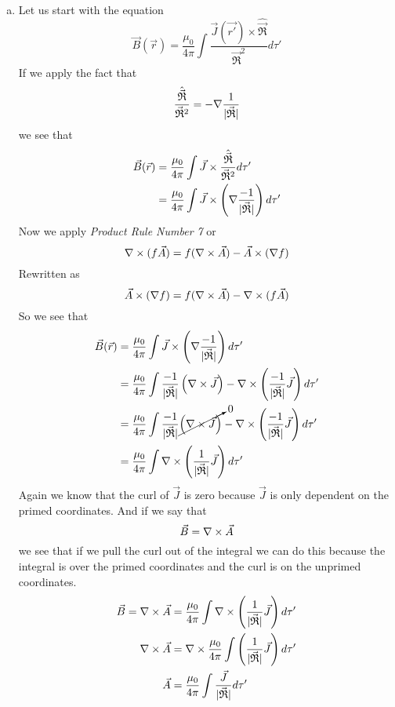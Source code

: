 \documentclass[11pt]{article}
\numberwithin{equation}{section}
\newcommand{\grad}{\bold\nabla}
\newcommand{\scrptR}{\vec{\mathfrak{R}}}
\begin{document}
\begin{enumerate}[(a)]
\item
Let us start with the equation
$$\vec{B}(\vec{r}) = \frac{\mu_0}{4\pi}\int\frac{\vec{J}(\vec{r'})\times\hat{\scrptR}}{\scrptR^2}d\tau'$$
If we apply the fact that
$$\frac{\hat{\scrptR}}{\scrptR^2} = -\grad\frac{1}{|\scrptR|}$$
we see that
\begin{align*}
\vec{B}(\vec{r}) &= \frac{\mu_0}{4\pi}\int\vec{J}\times\frac{\hat{\scrptR}}{\scrptR^2}d\tau'\\
&= \frac{\mu_0}{4\pi}\int\vec{J}\times\left(\grad\frac{-1}{|\scrptR|}\right)d\tau'
\end{align*}
Now we apply \emph{Product Rule Number 7} or
$$\grad\times(f\vec{A})=f(\grad\times\vec{A})-\vec{A}\times(\grad f)$$
Rewritten as
$$\vec{A}\times(\grad f)= f(\grad\times\vec{A})-\grad\times(f\vec{A}) $$
So we see that
\begin{align*}
\vec{B}(\vec{r}) &= \frac{\mu_0}{4\pi}\int\vec{J}\times\left(\grad\frac{-1}{|\scrptR|}\right)d\tau'\\
&= \frac{\mu_0}{4\pi}\int\frac{-1}{|\scrptR|}\left(\grad\times\vec{J}\right) - \grad\times\left(\frac{-1}{|\scrptR|}\vec{J}\right)d\tau'\\
&= \frac{\mu_0}{4\pi}\int\frac{-1}{|\scrptR|}\cancelto{0}{\left(\grad\times\vec{J}\right)} - \grad\times\left(\frac{-1}{|\scrptR|}\vec{J}\right)d\tau'\\
&= \frac{\mu_0}{4\pi}\int  \grad\times\left(\frac{1}{|\scrptR|}\vec{J}\right)d\tau'
\end{align*}
Again we know that the curl of $\vec{J}$ is zero because $\vec{J}$ is only dependent on the primed coordinates. And if we say that
$$\vec{B} = \grad\times\vec{A}$$
we see that if we pull the curl out of the integral we can do this because the integral is over the primed coordinates and the curl is on the unprimed coordinates.
\begin{align*}
\vec{B} = \grad\times\vec{A} &= \frac{\mu_0}{4\pi}\int  \grad\times\left(\frac{1}{|\scrptR|}\vec{J}\right)d\tau'\\
\grad\times\vec{A} &= \grad\times\frac{\mu_0}{4\pi}\int\left(\frac{1}{|\scrptR|}\vec{J}\right)d\tau'\\
\vec{A} &= \frac{\mu_0}{4\pi}\int\frac{\vec{J}}{|\scrptR|}d\tau'\\
\end{align*}


\end{enumerate}
\end{document}

